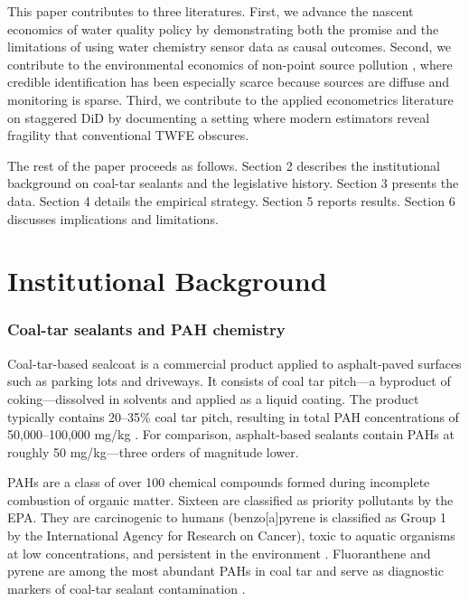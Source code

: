 \documentclass[12pt]{article}
\begin{document}
This paper contributes to three literatures. First, we advance the nascent economics of water quality policy \citep{keiser2019consequences, greenstone2006cost} by demonstrating both the promise and the limitations of using water chemistry sensor data as causal outcomes. Second, we contribute to the environmental economics of non-point source pollution \citep{olmstead2010applying, shortle2012reforming}, where credible identification has been especially scarce because sources are diffuse and monitoring is sparse. Third, we contribute to the applied econometrics literature on staggered DiD \citep{goodman2021difference, dechaisemartin2020two} by documenting a setting where modern estimators reveal fragility that conventional TWFE obscures.

The rest of the paper proceeds as follows. Section 2 describes the institutional background on coal-tar sealants and the legislative history. Section 3 presents the data. Section 4 details the empirical strategy. Section 5 reports results. Section 6 discusses implications and limitations.

\section{Institutional Background}

\subsubsection*{Coal-tar sealants and PAH chemistry} Coal-tar-based sealcoat is a commercial product applied to asphalt-paved surfaces such as parking lots and driveways. It consists of coal tar pitch---a byproduct of coking---dissolved in solvents and applied as a liquid coating. The product typically contains 20--35\% coal tar pitch, resulting in total PAH concentrations of 50,000--100,000 mg/kg \citep{mahler2012coal}. For comparison, asphalt-based sealants contain PAHs at roughly 50 mg/kg---three orders of magnitude lower.

PAHs are a class of over 100 chemical compounds formed during incomplete combustion of organic matter. Sixteen are classified as priority pollutants by the EPA. They are carcinogenic to humans (benzo[a]pyrene is classified as Group 1 by the International Agency for Research on Cancer), toxic to aquatic organisms at low concentrations, and persistent in the environment \citep{epa2010pah}. Fluoranthene and pyrene are among the most abundant PAHs in coal tar and serve as diagnostic markers of coal-tar sealant contamination \citep{vanmetre2012use}.
\end{document}
